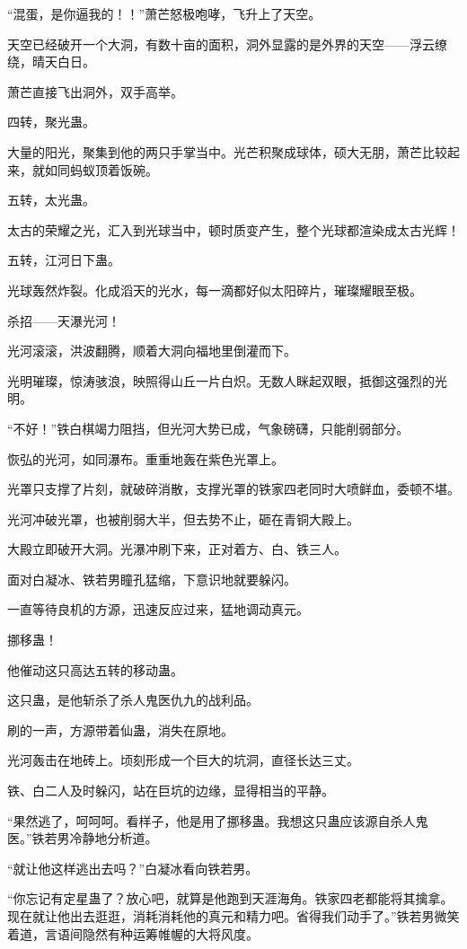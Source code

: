 \begin{this_body}
“混蛋，是你逼我的！！”萧芒怒极咆哮，飞升上了天空。

天空已经破开一个大洞，有数十亩的面积，洞外显露的是外界的天空——浮云缭绕，晴天白日。

萧芒直接飞出洞外，双手高举。

四转，聚光蛊。

大量的阳光，聚集到他的两只手掌当中。光芒积聚成球体，硕大无朋，萧芒比较起来，就如同蚂蚁顶着饭碗。

五转，太光蛊。

太古的荣耀之光，汇入到光球当中，顿时质变产生，整个光球都渲染成太古光辉！

五转，江河日下蛊。

光球轰然炸裂。化成滔天的光水，每一滴都好似太阳碎片，璀璨耀眼至极。

杀招——天瀑光河！

光河滚滚，洪波翻腾，顺着大洞向福地里倒灌而下。

光明璀璨，惊涛骇浪，映照得山丘一片白炽。无数人眯起双眼，抵御这强烈的光明。

“不好！”铁白棋竭力阻挡，但光河大势已成，气象磅礴，只能削弱部分。

恢弘的光河，如同瀑布。重重地轰在紫色光罩上。

光罩只支撑了片刻，就破碎消散，支撑光罩的铁家四老同时大喷鲜血，委顿不堪。

光河冲破光罩，也被削弱大半，但去势不止，砸在青铜大殿上。

大殿立即破开大洞。光瀑冲刷下来，正对着方、白、铁三人。

面对白凝冰、铁若男瞳孔猛缩，下意识地就要躲闪。

一直等待良机的方源，迅速反应过来，猛地调动真元。

挪移蛊！

他催动这只高达五转的移动蛊。

这只蛊，是他斩杀了杀人鬼医仇九的战利品。

刷的一声，方源带着仙蛊，消失在原地。

光河轰击在地砖上。顷刻形成一个巨大的坑洞，直径长达三丈。

铁、白二人及时躲闪，站在巨坑的边缘，显得相当的平静。

“果然逃了，呵呵呵。看样子，他是用了挪移蛊。我想这只蛊应该源自杀人鬼医。”铁若男冷静地分析道。

“就让他这样逃出去吗？”白凝冰看向铁若男。

“你忘记有定星蛊了？放心吧，就算是他跑到天涯海角。铁家四老都能将其擒拿。现在就让他出去逛逛，消耗消耗他的真元和精力吧。省得我们动手了。”铁若男微笑着道，言语间隐然有种运筹帷幄的大将风度。


\end{this_body}
